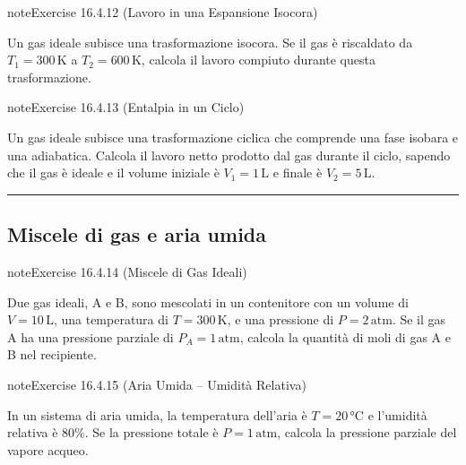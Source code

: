 \documentclass[letterpaper,10pt,italian]{jupyterBook}
\begin{document}
\begin{sphinxadmonition}{note}{Exercise 16.4.12 (Lavoro in una Espansione Isocora)}



\sphinxAtStartPar
Un gas ideale subisce una trasformazione isocora. Se il gas è riscaldato da \(T_1 = 300 \, \text{K}\) a \(T_2 = 600 \, \text{K}\), calcola il lavoro compiuto durante questa trasformazione.
\end{sphinxadmonition}
 \label{exercise:ch/thermodynamics/matter-problems-exercise-12}

\begin{sphinxadmonition}{note}{Exercise 16.4.13 (Entalpia in un Ciclo)}



\sphinxAtStartPar
Un gas ideale subisce una trasformazione ciclica che comprende una fase isobara e una adiabatica. Calcola il lavoro netto prodotto dal gas durante il ciclo, sapendo che il gas è ideale e il volume iniziale è \(V_1 = 1 \, \text{L}\) e finale è \(V_2 = 5 \, \text{L}\).
\end{sphinxadmonition}


\bigskip\hrule\bigskip



\subsection{Miscele di gas e aria umida}
\label{\detokenize{ch/thermodynamics/matter-problems:miscele-di-gas-e-aria-umida}} \label{exercise:ch/thermodynamics/matter-problems-exercise-13}

\begin{sphinxadmonition}{note}{Exercise 16.4.14 (Miscele di Gas Ideali)}



\sphinxAtStartPar
Due gas ideali, A e B, sono mescolati in un contenitore con un volume di \(V = 10 \, \text{L}\), una temperatura di \(T = 300 \, \text{K}\), e una pressione di \(P = 2 \, \text{atm}\). Se il gas A ha una pressione parziale di \(P_A = 1 \, \text{atm}\), calcola la quantità di moli di gas A e B nel recipiente.
\end{sphinxadmonition}
 \label{exercise:ch/thermodynamics/matter-problems-exercise-14}

\begin{sphinxadmonition}{note}{Exercise 16.4.15 (Aria Umida – Umidità Relativa)}



\sphinxAtStartPar
In un sistema di aria umida, la temperatura dell’aria è \(T = 20 \, \text{°C}\) e l’umidità relativa è \(80\%\). Se la pressione totale è \(P = 1 \, \text{atm}\), calcola la pressione parziale del vapore acqueo.
\end{sphinxadmonition}
 \label{exercise:ch/thermodynamics/matter-problems-exercise-15}
\end{document}
